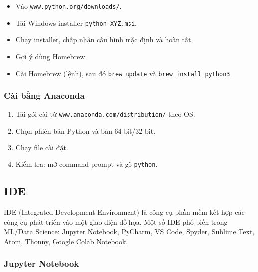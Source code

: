\begin{phuongphap}[title={Windows (tóm tắt)}]
\begin{itemize}
  \item Vào \texttt{www.python.org/downloads/}.
  \item Tải Windows installer \texttt{python-XYZ.msi}.
  \item Chạy installer, chấp nhận cấu hình mặc định và hoàn tất.
\end{itemize}
\end{phuongphap}

\begin{phuongphap}[title={MacOS (tóm tắt)}]
\begin{itemize}
  \item Gợi ý dùng Homebrew.
  \item Cài Homebrew (lệnh), sau đó \texttt{brew update} và \texttt{brew install python3}.
\end{itemize}
\end{phuongphap}

\subsubsection{Cài bằng Anaconda}
\begin{phuongphap}[title={Các bước}]
\begin{enumerate}
  \item Tải gói cài từ \texttt{www.anaconda.com/distribution/} theo OS.
  \item Chọn phiên bản Python và bản 64-bit/32-bit.
  \item Chạy file cài đặt.
  \item Kiểm tra: mở command prompt và gõ \texttt{python}.
\end{enumerate}
\end{phuongphap}

\subsection{IDE}

\begin{dinhnghia}[title={IDE là gì?}]
IDE (Integrated Development Environment) là công cụ phần mềm kết hợp các công cụ phát triển vào một giao diện đồ họa.
Một số IDE phổ biến trong ML/Data Science: Jupyter Notebook, PyCharm, VS Code, Spyder, Sublime Text, Atom, Thonny, Google Colab Notebook.
\end{dinhnghia}

\subsubsection{Jupyter Notebook}

